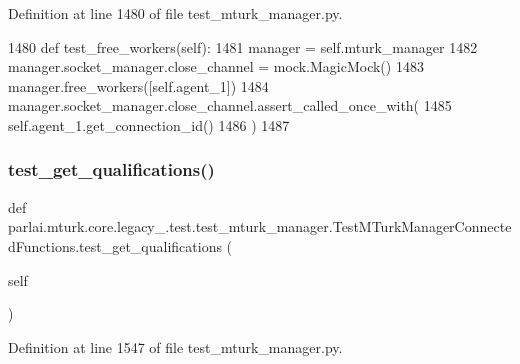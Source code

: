 Definition at line 1480 of file test\+\_\+mturk\+\_\+manager.\+py.


\begin{DoxyCode}
1480     \textcolor{keyword}{def }test\_free\_workers(self):
1481         manager = self.mturk\_manager
1482         manager.socket\_manager.close\_channel = mock.MagicMock()
1483         manager.free\_workers([self.agent\_1])
1484         manager.socket\_manager.close\_channel.assert\_called\_once\_with(
1485             self.agent\_1.get\_connection\_id()
1486         )
1487 
\end{DoxyCode}
\mbox{\label{classparlai_1_1mturk_1_1core_1_1legacy__2018_1_1test_1_1test__mturk__manager_1_1TestMTurkManagerConnectedFunctions_ad8c83e071667afb64202b6ddd6c69d94}} 
\subsubsection{\texorpdfstring{test\+\_\+get\+\_\+qualifications()}{test\_get\_qualifications()}}
{\footnotesize\ttfamily def parlai.\+mturk.\+core.\+legacy\+\_.\+test.\+test\+\_\+mturk\+\_\+manager.\+Test\+M\+Turk\+Manager\+Connected\+Functions.\+test\+\_\+get\+\_\+qualifications (\begin{DoxyParamCaption}\item[{}]{self }\end{DoxyParamCaption})}



Definition at line 1547 of file test\+\_\+mturk\+\_\+manager.\+py.


